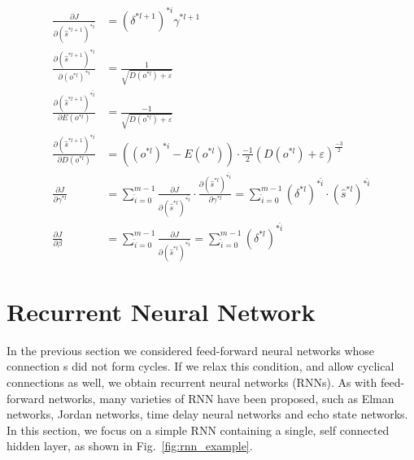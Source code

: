 \documentclass[runningheads,openany]{xhlPaper}
\begin{document}
\begin{equation}
\begin{aligned}
\frac{{\partial J}}{{\partial {{\left( {{{\hat s}^{*l + 1}}} \right)}^{*\hat i}}}} &= {\left( {{\delta ^{*l + 1}}} \right)^{*i}}{\gamma ^{*l + 1}}\\
\frac{{\partial {{\left( {{{\hat s}^{*l + 1}}} \right)}^{*i}}}}{{\partial {{\left( {{o^{*l}}} \right)}^{*i}}}} &= \frac{1}{{\sqrt {D\left( {{o^{*l}}} \right) + \varepsilon } }}\\
\frac{{\partial {{\left( {{{\hat s}^{*l + 1}}} \right)}^{*\hat i}}}}{{\partial E\left( {{o^{*l}}} \right)}} &= \frac{{ - 1}}{{\sqrt {D\left( {{o^{*l}}} \right) + \varepsilon } }}\\
\frac{{\partial {{\left( {{{\hat s}^{*l + 1}}} \right)}^{*i}}}}{{\partial D\left( {{o^{*l}}} \right)}} &= \left( {{{\left( {{o^{*l}}} \right)}^{*i}} - E\left( {{o^{*l}}} \right)} \right) \cdot \frac{{ - 1}}{2}{\left( {D\left( {{o^{*l}}} \right) + \varepsilon } \right)^{\frac{{ - 3}}{2}}}\\
\frac{{\partial J}}{{\partial {\gamma ^{*l}}}} &= \sum\limits_{\hat i = 0}^{m - 1} {\frac{{\partial J}}{{\partial {{\left( {{{\hat s}^{*l}}} \right)}^{*\hat i}}}} \cdot \frac{{\partial {{\left( {{{\hat s}^{*l}}} \right)}^{*\hat i}}}}{{\partial {\gamma ^{*l}}}}} = \sum\limits_{\hat i = 0}^{m - 1} {{{\left( {{\delta ^{*l}}} \right)}^{*\hat i}} \cdot {{\left( {{{\hat s}^{*l}}} \right)}^{*\hat i}}} \\
\frac{{\partial J}}{{\partial \beta }} &= \sum\limits_{\hat i = 0}^{m - 1} {\frac{{\partial J}}{{\partial {{\left( {{{\hat s}^{*l}}} \right)}^{*\hat i}}}}}  = \sum\limits_{\hat i = 0}^{m - 1} {{{\left( {{\delta ^{*l}}} \right)}^{*\hat i}}} 
\end{aligned}
\end{equation}

\section{Recurrent Neural Network}
\label{sec:rnn}
In the previous section we considered feed-forward neural networks whose connection s did not form cycles. If we relax this condition, and allow cyclical connections as well, we obtain recurrent neural networks (RNNs).
As with feed-forward networks, many varieties of RNN have been proposed, such as Elman networks, Jordan networks, time delay neural networks and echo state networks.
In this section, we focus on a simple RNN containing a single, self connected hidden layer, as shown in Fig.~\ref{fig:rnn_example}.
\end{document}
